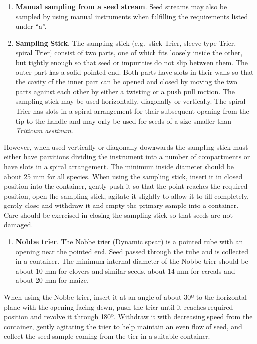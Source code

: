 \documentclass[]{book}
\providecommand{\tightlist}{%
  \setlength{\itemsep}{0pt}\setlength{\parskip}{0pt}}
\begin{document}
\begin{enumerate}
\def\labelenumi{\alph{enumi}.}
\item
  \textbf{Manual sampling from a seed stream}. Seed streams may also be
  sampled by using manual instruments when fulfilling the requirements
  listed under ``a''.
\item
  \textbf{Sampling Stick}. The sampling stick (e.g.~stick Trier, sleeve
  type Trier, spiral Trier) consist of two parts, one of which fits
  loosely inside the other, but tightly enough so that seed or
  impurities do not slip between them. The outer part has a solid
  pointed end. Both parts have slots in their walls so that the cavity
  of the inner part can be opened and closed by moving the two parts
  against each other by either a twisting or a push pull motion. The
  sampling stick may be used horizontally, diagonally or vertically. The
  spiral Trier has slots in a spiral arrangement for their subsequent
  opening from the tip to the handle and may only be used for seeds of a
  size smaller than \emph{Triticum aestivum}.
\end{enumerate}

However, when used vertically or diagonally downwards the sampling stick
must either have partitions dividing the instrument into a number of
compartments or have slots in a spiral arrangement. The minimum inside
diameter should be about 25 mm for all species. When using the sampling
stick, insert it in closed position into the container, gently push it
so that the point reaches the required position, open the sampling
stick, agitate it slightly to allow it to fill completely, gently close
and withdraw it and empty the primary sample into a container. Care
should be exercised in closing the sampling stick so that seeds are not
damaged.

\begin{enumerate}
\def\labelenumi{\alph{enumi}.}
\setcounter{enumi}{2}
\tightlist
\item
  \textbf{Nobbe trier}. The Nobbe trier (Dynamic spear) is a pointed
  tube with an opening near the pointed end. Seed passed through the
  tube and is collected in a container. The minimum internal diameter of
  the Nobbe trier should be about 10 mm for clovers and similar seeds,
  about 14 mm for cereals and about 20 mm for maize.
\end{enumerate}

When using the Nobbe trier, insert it at an angle of about 30º to the
horizontal plane with the opening facing down, push the trier until it
reaches required position and revolve it through 180º. Withdraw it with
decreasing speed from the container, gently agitating the trier to help
maintain an even flow of seed, and collect the seed sample coming from
the tier in a suitable container.
\end{document}
